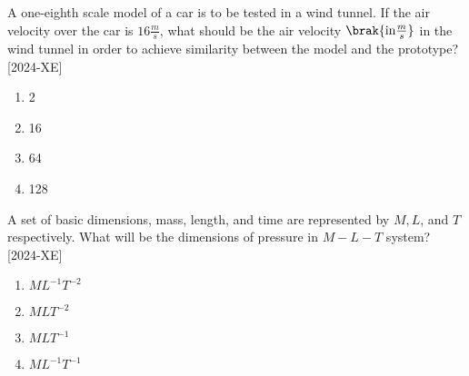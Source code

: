\item A one-eighth scale model of a car is to be tested in a wind tunnel. If the air velocity over the car is $16 \frac{m}{s}$, what should be the air velocity $\brak{\text{in} \frac{m}{s}}$ in the wind tunnel in order to achieve similarity between the model and the prototype? \hfill{[2024-XE]}\\
\begin{enumerate}
    \item 2\\
    \item 16\\
    \item 64\\
    \item 128\\
\end{enumerate}

\item A set of basic dimensions, mass, length, and time are represented by $M, L$, and $T$ respectively. What will be the dimensions of pressure in $M-L-T$ system? \hfill{[2024-XE]}\\
\begin{enumerate}
    \item $ML^{-1}T^{-2}$\\
    \item $MLT^{-2}$\\
    \item $MLT^{-1}$\\
    \item $ML^{-1}T^{-1}$\\
\end{enumerate}

